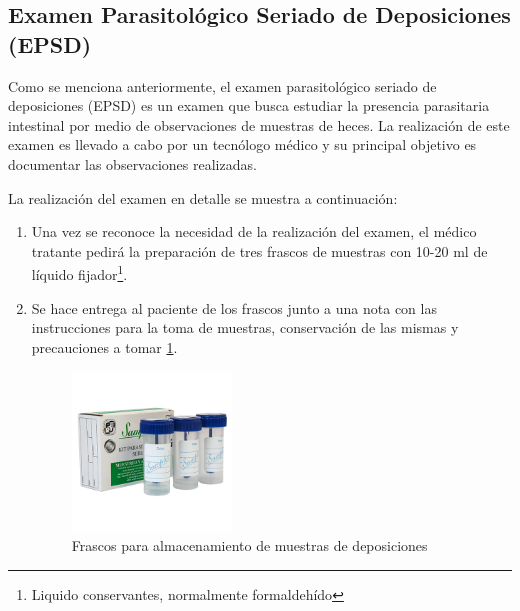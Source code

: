 \documentclass[letter,12pt]{report}
\begin{document}
\subsection{Examen Parasitológico Seriado de Deposiciones (EPSD)}
Como se menciona anteriormente, el examen parasitológico seriado de deposiciones (EPSD)
es un examen que busca estudiar la presencia parasitaria intestinal por medio de
observaciones de muestras de heces. La realización de este examen es llevado a cabo por
un tecnólogo médico y su principal objetivo es documentar las observaciones realizadas.

La realización del examen en detalle se muestra a continuación:\cite{Serial}
\begin{enumerate}
    \item Una vez se reconoce la necesidad de la realización del examen, el médico
        tratante pedirá la preparación de tres frascos de muestras con 10-20 ml de
        líquido fijador\footnote{Liquido conservantes, normalmente formaldehído}.
    \item Se hace entrega al paciente de los frascos junto a una nota con las
        instrucciones para la toma de muestras, conservación de las mismas y precauciones
        a tomar \ref{fig:frascos}.
        \begin{figure}[H]
            \centering
            \includegraphics[width=0.4\textwidth]{frascos}
            \caption{Frascos para almacenamiento de muestras de deposiciones}
            \label{fig:frascos}
        \end{figure}


\end{enumerate}
\end{document}
